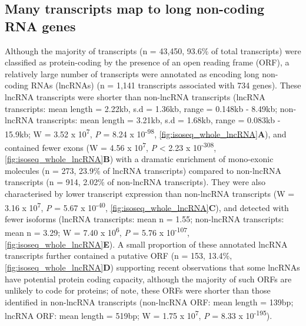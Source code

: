 \subsection{Many transcripts map to long non-coding RNA genes}
Although the majority of transcripts (n = 43,450, 93.6\% of total transcripts) were classified as protein-coding by the presence of an open reading frame (ORF), a relatively large number of transcripts were annotated as encoding long non-coding RNAs (lncRNAs) (n = 1,141 transcripts associated with 734 genes). These lncRNA transcripts were shorter than non-lncRNA transcripts (lncRNA transcripts: mean length = 2.22kb, s.d = 1.36kb, range = 0.148kb - 8.49kb; non-lncRNA transcripts: mean length = 3.21kb, s.d = 1.68kb, range = 0.083kb - 15.9kb; W = 3.52 x 10\textsuperscript{7}, \textit{P} = 8.24 x 10\textsuperscript{-98}, \cref{fig:isoseq_whole_lncRNA}\textbf{A}), and contained fewer exons\cite{Statello2020} (W = 4.56 x 10\textsuperscript{7}, \textit{P} < 2.23 x 10\textsuperscript{-308}, \cref{fig:isoseq_whole_lncRNA}\textbf{B}) with a dramatic enrichment of mono-exonic molecules\cite{Kuo2017} (n = 273, 23.9\% of lncRNA transcripts) compared to non-lncRNA transcripts (n = 914, 2.02\% of non-lncRNA transcripts). They were also characterised by lower transcript expression than non-lncRNA transcripts \cite{Statello2020, Liu2016a} (W = 3.16 x 10\textsuperscript{7}, \textit{P} = 5.67 x 10\textsuperscript{-40}, \cref{fig:isoseq_whole_lncRNA}\textbf{C}), and detected with fewer isoforms (lncRNA transcripts: mean n = 1.55; non-lncRNA transcripts: mean n = 3.29; W = 7.40 x 10\textsuperscript{6}, \textit{P} = 5.76 x 10\textsuperscript{-107}, \cref{fig:isoseq_whole_lncRNA}\textbf{E}). A small proportion of these annotated lncRNA transcripts further contained a putative ORF (n = 153, 13.4\%, \cref{fig:isoseq_whole_lncRNA}\textbf{D}) supporting recent observations that some lncRNAs have potential protein coding capacity\cite{Kageyama2011}, although the majority of such ORFs are unlikely to code for proteins\cite{Guttman2013}; of note, these ORFs were shorter than those identified in non-lncRNA transcripts (non-lncRNA ORF: mean length = 139bp; lncRNA ORF: mean length = 519bp; W = 1.75 x 10\textsuperscript{7}, \textit{P} = 8.33 x 10\textsuperscript{-195}). 

